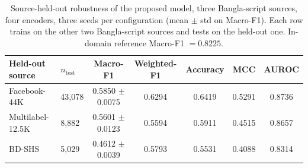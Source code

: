 \begin{table}[!htbp]
\centering
\caption{Source-held-out robustness of the proposed model, three Bangla-script sources, four encoders, three seeds per configuration (mean $\pm$ std on Macro-F1). Each row trains on the other two Bangla-script sources and tests on the held-out one. In-domain reference Macro-F1 $= 0.8225$.}
\label{tab:robustness}
\small
\begin{tabular}{@{}llccccc@{}}
\toprule
\textbf{Held-out source} & \textbf{$n_{\mathrm{test}}$} & \textbf{Macro-F1} & \textbf{Weighted-F1} & \textbf{Accuracy} & \textbf{MCC} & \textbf{AUROC} \\
\midrule
Facebook-44K & 43,078 & 0.5850 $\pm$ 0.0075 & 0.6294 & 0.6419 & 0.5291 & 0.8736 \\
Multilabel-12.5K & 8,882 & 0.5601 $\pm$ 0.0123 & 0.5594 & 0.5911 & 0.4515 & 0.8657 \\
BD-SHS & 5,029 & 0.4612 $\pm$ 0.0039 & 0.5793 & 0.5531 & 0.4088 & 0.8314 \\
\bottomrule
\end{tabular}
\end{table}